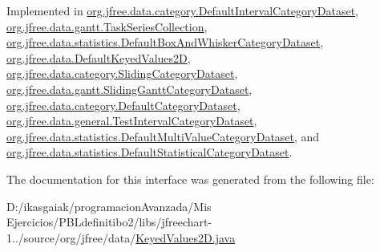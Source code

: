 Implemented in \mbox{\hyperlink{classorg_1_1jfree_1_1data_1_1category_1_1_default_interval_category_dataset_a29084222ab5d48db99953fabcd209d03}{org.\+jfree.\+data.\+category.\+Default\+Interval\+Category\+Dataset}}, \mbox{\hyperlink{classorg_1_1jfree_1_1data_1_1gantt_1_1_task_series_collection_a89f6f1df4d88768e84b3bd313cbd3eab}{org.\+jfree.\+data.\+gantt.\+Task\+Series\+Collection}}, \mbox{\hyperlink{classorg_1_1jfree_1_1data_1_1statistics_1_1_default_box_and_whisker_category_dataset_a1cc42e6e9cebb07fc3ad2bab59733088}{org.\+jfree.\+data.\+statistics.\+Default\+Box\+And\+Whisker\+Category\+Dataset}}, \mbox{\hyperlink{classorg_1_1jfree_1_1data_1_1_default_keyed_values2_d_a12490c45f6bd535f4cb0bbb5f6127567}{org.\+jfree.\+data.\+Default\+Keyed\+Values2D}}, \mbox{\hyperlink{classorg_1_1jfree_1_1data_1_1category_1_1_sliding_category_dataset_a18db7dd73ce5bd7e83174d8bc2db6e80}{org.\+jfree.\+data.\+category.\+Sliding\+Category\+Dataset}}, \mbox{\hyperlink{classorg_1_1jfree_1_1data_1_1gantt_1_1_sliding_gantt_category_dataset_aad13ed434468a34eef42391095e57ce4}{org.\+jfree.\+data.\+gantt.\+Sliding\+Gantt\+Category\+Dataset}}, \mbox{\hyperlink{classorg_1_1jfree_1_1data_1_1category_1_1_default_category_dataset_a5e7aadea1d0257eaccec5836b66a0d3e}{org.\+jfree.\+data.\+category.\+Default\+Category\+Dataset}}, \mbox{\hyperlink{classorg_1_1jfree_1_1data_1_1general_1_1_test_interval_category_dataset_a0ae7aff04c45ad61c8b0cea8be0b2d1e}{org.\+jfree.\+data.\+general.\+Test\+Interval\+Category\+Dataset}}, \mbox{\hyperlink{classorg_1_1jfree_1_1data_1_1statistics_1_1_default_multi_value_category_dataset_ad4f8c7103acbcdf5fb2ce723d4ea360b}{org.\+jfree.\+data.\+statistics.\+Default\+Multi\+Value\+Category\+Dataset}}, and \mbox{\hyperlink{classorg_1_1jfree_1_1data_1_1statistics_1_1_default_statistical_category_dataset_abd1e47cb280bcac4a251fcc160953f58}{org.\+jfree.\+data.\+statistics.\+Default\+Statistical\+Category\+Dataset}}.



The documentation for this interface was generated from the following file\+:\begin{DoxyCompactItemize}
\item 
D\+:/ikasgaiak/programacion\+Avanzada/\+Mis Ejercicios/\+P\+B\+Ldefinitibo2/libs/jfreechart-\/1../source/org/jfree/data/\mbox{\hyperlink{_keyed_values2_d_8java}{Keyed\+Values2\+D.\+java}}\end{DoxyCompactItemize}

